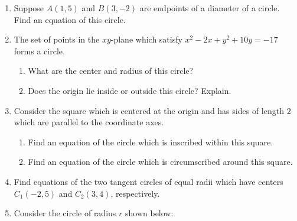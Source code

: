 \documentclass[12pt]{article}
\newif\ifans
\begin{document}
\begin{enumerate}
\item Suppose $A(1,5)$ and $B(3,-2)$ are endpoints of a diameter of a circle.  Find an equation of this circle.

\ifans\fbox{$(x-2)^2+\left(y-\frac{3}{2}\right)^2=\frac{53}{4}$}\fi

\item The set of points in the $xy$-plane which satisfy $x^2-2x+y^2+10y=-17$ forms a circle.

\begin{enumerate}

\item What are the center and radius of this circle?

\ifans\fbox{Center $(1,-5)$, radius $r=3$} \fi

\item Does the origin lie inside or outside this circle?  Explain.

\ifans{\fbox{The origin is outside of the circle.}}\fi

\end{enumerate}

\item Consider the square which is centered at the origin and has sides of length $2$ which are parallel to the coordinate axes.

\begin{enumerate}

\item Find an equation of the circle which is inscribed within this square.

\ifans{\fbox{$x^2+y^2=1$}} \fi

\item Find an equation of the circle which is circumscribed around this square.

\ifans{\fbox{$x^2+y^2=2$}} \fi

\end{enumerate}

\item Find equations of the two tangent circles of equal radii which have centers $C_1(-2,5)$ and $C_2(3,4)$, respectively.

\ifans{\fbox{$(x+2)^2+(y-5)^2=\frac{13}{2}$ and $(x-3)^2+(y-4)^2=\frac{13}{2}$}} \fi

\item Consider the circle of radius $r$ shown below:


\end{enumerate}
\end{document}
